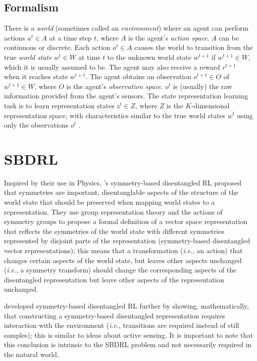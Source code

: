 \subsection{Formalism}

There is a \textit{world} (sometimes called an \textit{environment}) where an agent can perform actions $a^{t} \in A$ at a time step $t$, where $A$ is the agent's \textit{action space}.
$A$ can be continuous or discrete.
Each action $a^{t} \in A$ causes the world to transition from the true \textit{world state} $w^{t} \in W$ at time $t$ to the unknown world state $w^{t+1}$ if $w^{t+1} \in W$, which it is usually assumed to be.
The agent may also receive a reward $r^{t+1}$ when it reaches state $w^{t+1}$.
The agent obtains an observation $o^{t+1} \in O$ of $w^{t+1} \in W$, where $O$ is the agent's \textit{observation space}.
$o^{t}$ is (usually) the raw information provided from the agent's sensors.
The state representation learning task is to learn representation states $z^{t} \in Z$, where $Z$ is the $K$-dimensional representation space, with characteristics similar to the true world states $w^{t}$ using only the observations $o^{t}$ \autocite{Lesort2018StateRL}.

\section{SBDRL}\label{sec:SBDRL}

Inspired by their use in Physics, \autocite{Higgins2018}'s symmetry-based disentangled RL proposed that symmetries are important, disentanglable aspects of the structure of the world state that should be preserved when mapping world states to a representation.
They use group representation theory and the actions of symmetry groups to propose a formal definition of a vector space representation that reflects the symmetries of the world state with different symmetries represented by disjoint parts of the representation (symmetry-based disentangled vector representations); this means that a transformation (\textit{i.e.}, an action) that changes certain aspects of the world state, but leaves other aspects unchanged (\textit{i.e.}, a symmetry transform) should change the corresponding aspects of the disentangled representation but leave other aspects of the representation unchanged.

\autocite{caselles2019symmetry} developed symmetry-based disentangled RL further by showing, mathematically, that constructing a symmetry-based disentangled representation requires interaction with the environment (\textit{i.e.}, transitions are required instead of still samples); this is similar to ideas about active sensing.
It is important to note that this conclusion is intrinsic to the SBDRL problem and not necessarily required in the natural world.

